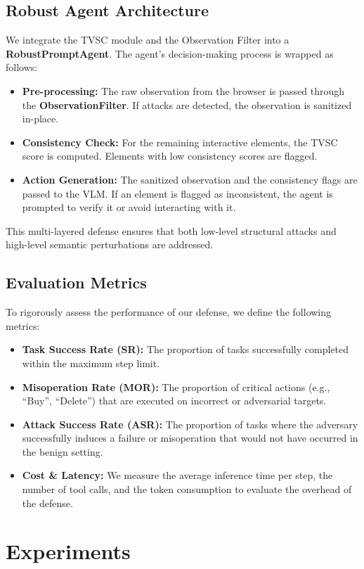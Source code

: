 \documentclass{llncs}
\begin{document}
\subsection{Robust Agent Architecture}
We integrate the TVSC module and the Observation Filter into a \textbf{RobustPromptAgent}. The agent's decision-making process is wrapped as follows:
\begin{itemize}
    \item \textbf{Pre-processing:} The raw observation from the browser is passed through the \textbf{ObservationFilter}. If attacks are detected, the observation is sanitized in-place.
    \item \textbf{Consistency Check:} For the remaining interactive elements, the TVSC score is computed. Elements with low consistency scores are flagged.
    \item \textbf{Action Generation:} The sanitized observation and the consistency flags are passed to the VLM. If an element is flagged as inconsistent, the agent is prompted to verify it or avoid interacting with it.
\end{itemize}
This multi-layered defense ensures that both low-level structural attacks and high-level semantic perturbations are addressed.

\subsection{Evaluation Metrics}
To rigorously assess the performance of our defense, we define the following metrics:
\begin{itemize}
    \item \textbf{Task Success Rate (SR):} The proportion of tasks successfully completed within the maximum step limit.
    \item \textbf{Misoperation Rate (MOR):} The proportion of critical actions (e.g., ``Buy'', ``Delete'') that are executed on incorrect or adversarial targets.
    \item \textbf{Attack Success Rate (ASR):} The proportion of tasks where the adversary successfully induces a failure or misoperation that would not have occurred in the benign setting.
    \item \textbf{Cost \& Latency:} We measure the average inference time per step, the number of tool calls, and the token consumption to evaluate the overhead of the defense.
\end{itemize}

\section{Experiments}
\end{document}
